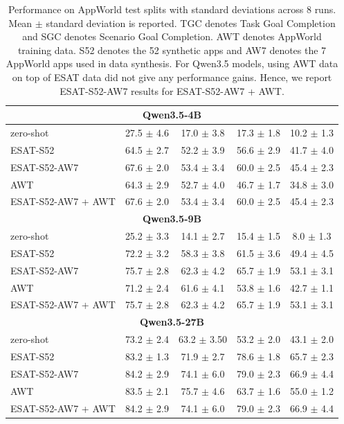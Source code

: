 \begin{table}[H]
{\begin{tabular}[b]{lcccc}
\multicolumn{5}{c}{\bf Qwen3.5-4B}\\
\midrule
zero-shot                   & 27.5 $\pm$ 4.6 & 17.0 $\pm$ 3.8 & 17.3 $\pm$ 1.8 & 10.2 $\pm$ 1.3 \\
\textsc{ESAT-S52}           & 64.5 $\pm$ 2.7 & 52.2 $\pm$ 3.9 & 56.6 $\pm$ 2.9 & 41.7 $\pm$ 4.0 \\
\textsc{ESAT-S52-AW7}       & 67.6 $\pm$ 2.0 & 53.4 $\pm$ 3.4 & 60.0 $\pm$ 2.5 & 45.4 $\pm$ 2.3 \\
\midrule
\textsc{AWT}                & 64.3 $\pm$ 2.9 & 52.7 $\pm$ 4.0 & 46.7 $\pm$ 1.7 & 34.8 $\pm$ 3.0 \\
\textsc{ESAT-S52-AW7 + AWT} & 67.6 $\pm$ 2.0 & 53.4 $\pm$ 3.4 & 60.0 $\pm$ 2.5 & 45.4 $\pm$ 2.3 \\
\midrule

\multicolumn{5}{c}{\bf Qwen3.5-9B}\\
\midrule
zero-shot                   & 25.2 $\pm$ 3.3 & 14.1 $\pm$ 2.7 & 15.4 $\pm$ 1.5 & 8.0 $\pm$ 1.3 \\
\textsc{ESAT-S52}           & 72.2 $\pm$ 3.2 & 58.3 $\pm$ 3.8 & 61.5 $\pm$ 3.6 & 49.4 $\pm$ 4.5 \\
\textsc{ESAT-S52-AW7}       & 75.7 $\pm$ 2.8 & 62.3 $\pm$ 4.2 & 65.7 $\pm$ 1.9 & 53.1 $\pm$ 3.1 \\
\midrule
\textsc{AWT}                & 71.2 $\pm$ 2.4 & 61.6 $\pm$ 4.1 & 53.8 $\pm$ 1.6 & 42.7 $\pm$ 1.1 \\
\textsc{ESAT-S52-AW7 + AWT} & 75.7 $\pm$ 2.8 & 62.3 $\pm$ 4.2 & 65.7 $\pm$ 1.9 & 53.1 $\pm$ 3.1 \\
\midrule

\multicolumn{5}{c}{\bf Qwen3.5-27B}\\
\midrule
zero-shot                   & 73.2 $\pm$ 2.4 & 63.2 $\pm$ 3.50 & 53.2 $\pm$ 2.0 & 43.1 $\pm$ 2.0 \\
\textsc{ESAT-S52}           & 83.2 $\pm$ 1.3 & 71.9 $\pm$ 2.7 & 78.6 $\pm$ 1.8 & 65.7 $\pm$ 2.3 \\
\textsc{ESAT-S52-AW7}       & 84.2 $\pm$ 2.9 & 74.1 $\pm$ 6.0 & 79.0 $\pm$ 2.3 & 66.9 $\pm$ 4.4 \\
\midrule
\textsc{AWT}                & 83.5 $\pm$ 2.1 & 75.7 $\pm$ 4.6 & 63.7 $\pm$ 1.6 & 55.0 $\pm$ 1.2 \\
\textsc{ESAT-S52-AW7 + AWT} & 84.2 $\pm$ 2.9 & 74.1 $\pm$ 6.0 & 79.0 $\pm$ 2.3 & 66.9 $\pm$ 4.4 \\
\bottomrule
\end{tabular}
}
\caption{Performance on AppWorld test splits with standard deviations across 8 runs. Mean $\pm$ standard deviation is reported. TGC denotes Task Goal Completion and SGC denotes Scenario Goal Completion. AWT denotes AppWorld training data. S52 denotes the 52 synthetic apps and AW7 denotes the 7 AppWorld apps used in data synthesis. For Qwen3.5 models, using AWT data on top of ESAT data did not give any performance gains. Hence, we report ESAT-S52-AW7 results for ESAT-S52-AW7 + AWT.}
\label{tab:appworld-app}
\end{table}
